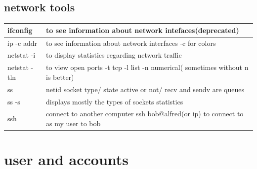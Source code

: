 \documentclass[10pt]{article}
\begin{document}
\subsection{network tools}
\begin{center}
	\begin{tabular}{|l|l|}
		\hline
		ifconfig & to see information about network intefaces(deprecated)\\
		\hline ip -c addr & to see information about network interfaces -c for colors\\
		\hline netstat -i   & to display statistics regarding network traffic\\
		\hline netstat -tln & to view open ports -t tcp -l list -n numerical( sometimes without n is better)\\
		\hline ss &netid socket type/ state active or not/ recv and sendv are queues\\
		\hline ss -s &displays mostly the types of sockets statistics\\
		\hline ssh &connect to another computer ssh bob@alfred(or ip) to connect to as my user to bob\\
		\hline
	\end{tabular}
\end{center}

\section{user and accounts}
\end{document}
